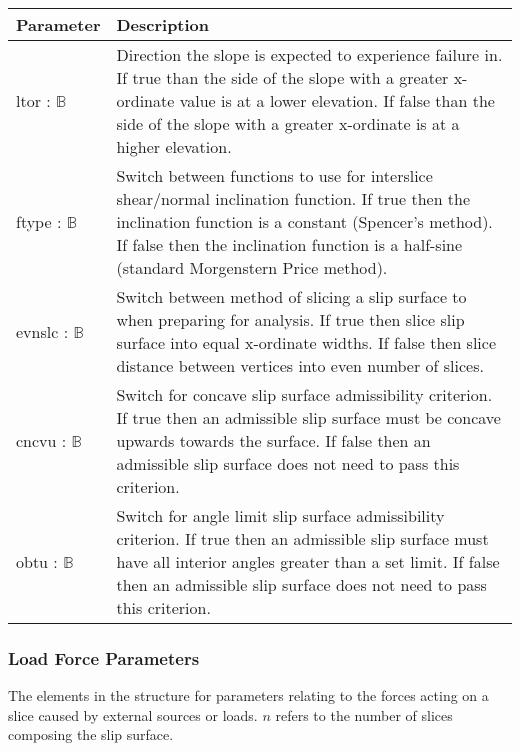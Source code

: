 \documentclass[12pt, titlepage]{article}
\begin{document}
\begin{center}
\begin{longtable}{ p{} 
    p{}}\hline 

  \textbf{Parameter} & \textbf{Description}\\ \hline

  ltor : $\mathbb{B}$ & Direction the slope is expected to
  experience failure in. If true than the side of the slope with a
  greater x-ordinate value is at a lower elevation. If false than the
  side of the slope with a greater x-ordinate is at a higher
  elevation.\\

  ftype : $\mathbb{B}$ & Switch between functions to use for
  interslice shear/normal inclination function. If true then the
  inclination function is a constant (Spencer's method). If false then
  the inclination function is a half-sine (standard Morgenstern Price
  method). \\

  evnslc : $\mathbb{B}$ & Switch between method of slicing a slip
  surface to when preparing for analysis. If true then slice slip
  surface into equal x-ordinate widths. If false then slice distance
  between vertices into even number of slices. \\

  cncvu : $\mathbb{B}$ & Switch for concave slip surface admissibility
  criterion. If true then an admissible slip surface must be concave
  upwards towards the surface. If false then an admissible slip
  surface does not need to pass this criterion.\\

  obtu : $\mathbb{B}$ & Switch for angle limit slip surface
  admissibility criterion. If true then an admissible slip surface
  must have all interior angles greater than a set limit. If false
  then an admissible slip surface does not need to pass this
  criterion.\\ \hline
\end{longtable}
\end{center}

\subsubsection{Load Force Parameters} \label{Tbl:LoadForceParam}
\noindent
The elements in the structure for parameters relating to the forces
acting on a slice caused by external sources or loads. $n$ refers to
the number of slices composing the slip surface.
\end{document}
